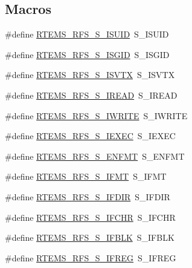\subsection*{Macros}
\begin{DoxyCompactItemize}
\item 
\#define \mbox{\hyperlink{rtems-rfs-inode_8h_af45fc0d702b0b171300888093713a8d5}{R\+T\+E\+M\+S\+\_\+\+R\+F\+S\+\_\+\+S\+\_\+\+I\+S\+U\+ID}}~S\+\_\+\+I\+S\+U\+ID
\item 
\#define \mbox{\hyperlink{rtems-rfs-inode_8h_aed5ea629dfd8ea33bd578453b0f76293}{R\+T\+E\+M\+S\+\_\+\+R\+F\+S\+\_\+\+S\+\_\+\+I\+S\+G\+ID}}~S\+\_\+\+I\+S\+G\+ID
\item 
\#define \mbox{\hyperlink{rtems-rfs-inode_8h_ad2b3cebcc41984d682bad08b45d8a3c8}{R\+T\+E\+M\+S\+\_\+\+R\+F\+S\+\_\+\+S\+\_\+\+I\+S\+V\+TX}}~S\+\_\+\+I\+S\+V\+TX
\item 
\#define \mbox{\hyperlink{rtems-rfs-inode_8h_aa315737e8e62670231e30f5c88d27ae1}{R\+T\+E\+M\+S\+\_\+\+R\+F\+S\+\_\+\+S\+\_\+\+I\+R\+E\+AD}}~S\+\_\+\+I\+R\+E\+AD
\item 
\#define \mbox{\hyperlink{rtems-rfs-inode_8h_a78e70e41c7af23e6302a52a8c6da8489}{R\+T\+E\+M\+S\+\_\+\+R\+F\+S\+\_\+\+S\+\_\+\+I\+W\+R\+I\+TE}}~S\+\_\+\+I\+W\+R\+I\+TE
\item 
\#define \mbox{\hyperlink{rtems-rfs-inode_8h_a8436eedb95b7732b8c8c66c14c15e751}{R\+T\+E\+M\+S\+\_\+\+R\+F\+S\+\_\+\+S\+\_\+\+I\+E\+X\+EC}}~S\+\_\+\+I\+E\+X\+EC
\item 
\#define \mbox{\hyperlink{rtems-rfs-inode_8h_aba1d4b038a970038b2bd5a5943d4b054}{R\+T\+E\+M\+S\+\_\+\+R\+F\+S\+\_\+\+S\+\_\+\+E\+N\+F\+MT}}~S\+\_\+\+E\+N\+F\+MT
\item 
\#define \mbox{\hyperlink{rtems-rfs-inode_8h_ad6c7d223eaf8cb5a947f71eb05c2cdb8}{R\+T\+E\+M\+S\+\_\+\+R\+F\+S\+\_\+\+S\+\_\+\+I\+F\+MT}}~S\+\_\+\+I\+F\+MT
\item 
\#define \mbox{\hyperlink{rtems-rfs-inode_8h_ab184ebc14afeccf1ebaab1cffd989c84}{R\+T\+E\+M\+S\+\_\+\+R\+F\+S\+\_\+\+S\+\_\+\+I\+F\+D\+IR}}~S\+\_\+\+I\+F\+D\+IR
\item 
\#define \mbox{\hyperlink{rtems-rfs-inode_8h_a67910f5eff71a52636ddb77d9d30a410}{R\+T\+E\+M\+S\+\_\+\+R\+F\+S\+\_\+\+S\+\_\+\+I\+F\+C\+HR}}~S\+\_\+\+I\+F\+C\+HR
\item 
\#define \mbox{\hyperlink{rtems-rfs-inode_8h_a80a4dc899f93f5c922f733ae69513000}{R\+T\+E\+M\+S\+\_\+\+R\+F\+S\+\_\+\+S\+\_\+\+I\+F\+B\+LK}}~S\+\_\+\+I\+F\+B\+LK
\item 
\#define \mbox{\hyperlink{rtems-rfs-inode_8h_ab17e3272c7242304573b442f806d670d}{R\+T\+E\+M\+S\+\_\+\+R\+F\+S\+\_\+\+S\+\_\+\+I\+F\+R\+EG}}~S\+\_\+\+I\+F\+R\+EG

\end{DoxyCompactItemize}
